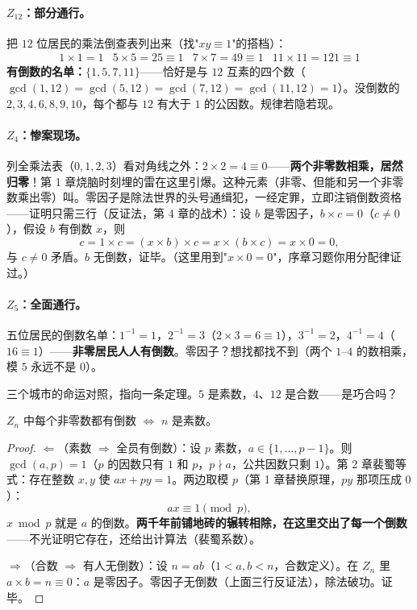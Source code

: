 \paragraph{$Z_{12}$：部分通行。}把 $12$ 位居民的乘法倒查表列出来（找"$xy \equiv 1$"的搭档）：
\[
\begin{array}{llll}
1\times1 = 1 & 5\times5 = 25\equiv 1 & 7\times7 = 49\equiv 1 & 11\times 11 = 121 \equiv 1
\end{array}
\]
\textbf{有倒数的名单：$\{1, 5, 7, 11\}$}——恰好是与 $12$ 互素的四个数（$\gcd(1,12)=\gcd(5,12)=\gcd(7,12)=\gcd(11,12)=1$）。没倒数的 $2,3,4,6,8,9,10$，每个都与 $12$ 有大于 $1$ 的公因数。规律若隐若现。

\paragraph{$Z_4$：惨案现场。}列全乘法表（$0,1,2,3$）看对角线之外：$2\times2 = 4 \equiv 0$——\textbf{两个非零数相乘，居然归零}！第 1 章烧脑时刻埋的雷在这里引爆。这种元素（非零、但能和另一个非零数乘出零）叫。零因子是除法世界的头号通缉犯，一经定罪，立即注销倒数资格——证明只需三行（反证法，第 4 章的战术）：设 $b$ 是零因子，$b\times c = 0$（$c \ne 0$），假设 $b$ 有倒数 $x$，则
\[
c = 1\times c = (x\times b)\times c = x\times(b\times c) = x\times 0 = 0 ,
\]
与 $c\ne0$ 矛盾。$b$ 无倒数，证毕。（这里用到"$x\times0=0$"，序章习题你用分配律证过。）

\paragraph{$Z_5$：全面通行。}五位居民的倒数名单：$1^{-1} = 1$，$2^{-1} = 3$（$2\times3 = 6\equiv1$），$3^{-1} = 2$，$4^{-1} = 4$（$16\equiv1$）——\textbf{非零居民人人有倒数}。零因子？想找都找不到（两个 $1$--$4$ 的数相乘，模 $5$ 永远不是 $0$）。

三个城市的命运对照，指向一条定理。$5$ 是素数，$4$、$12$ 是合数——是巧合吗？

\begin{dingli}[素数 $=$ 除法通行证]
$Z_n$ 中每个非零数都有倒数 $\iff$ $n$ 是素数。
\end{dingli}

\begin{proof}
$\Leftarrow$（素数 $\Rightarrow$ 全员有倒数）：设 $p$ 素数，$a \in \{1, \dots, p-1\}$。则 $\gcd(a, p) = 1$（$p$ 的因数只有 $1$ 和 $p$，$p\nmid a$，公共因数只剩 $1$）。第 2 章裴蜀等式：存在整数 $x, y$ 使 $ax + py = 1$。两边取模 $p$（第 1 章替换原理，$py$ 那项压成 $0$）：
\[
ax \equiv 1 \pmod p ,
\]
$x\bmod p$ 就是 $a$ 的倒数。\textbf{两千年前铺地砖的辗转相除，在这里交出了每一个倒数}——不光证明它存在，还给出计算法（裴蜀系数）。

$\Rightarrow$（合数 $\Rightarrow$ 有人无倒数）：设 $n = ab$（$1 < a, b < n$，合数定义）。在 $Z_n$ 里 $a\times b = n \equiv 0$：$a$ 是零因子。零因子无倒数（上面三行反证法），除法破功。证毕。
\end{proof}

